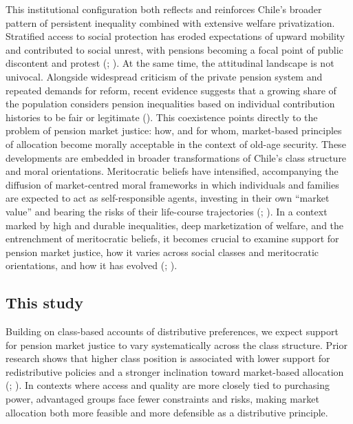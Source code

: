 \documentclass[
  12pt,
]{article}
\begin{document}
This institutional configuration both reflects and reinforces Chile's
broader pattern of persistent inequality combined with extensive welfare
privatization. Stratified access to social protection has eroded
expectations of upward mobility and contributed to social unrest, with
pensions becoming a focal point of public discontent and protest
(;
). At the same time, the
attitudinal landscape is not univocal. Alongside widespread criticism of
the private pension system and repeated demands for reform, recent
evidence suggests that a growing share of the population considers
pension inequalities based on individual contribution histories to be
fair or legitimate (). This coexistence points directly to the problem of pension
market justice: how, and for whom, market-based principles of allocation
become morally acceptable in the context of old-age security. These
developments are embedded in broader transformations of Chile's class
structure and moral orientations. Meritocratic beliefs have intensified,
accompanying the diffusion of market-centred moral frameworks in which
individuals and families are expected to act as self-responsible agents,
investing in their own ``market value'' and bearing the risks of their
life-course trajectories
(;
). In a context marked by
high and durable inequalities, deep marketization of welfare, and the
entrenchment of meritocratic beliefs, it becomes crucial to examine
support for pension market justice, how it varies across social classes
and meritocratic orientations, and how it has evolved
(;
).

\subsection{This study}\label{this-study}

Building on class-based accounts of distributive preferences, we expect
support for pension market justice to vary systematically across the
class structure. Prior research shows that higher class position is
associated with lower support for redistributive policies and a stronger
inclination toward market-based allocation
(;
). In contexts where access
and quality are more closely tied to purchasing power, advantaged groups
face fewer constraints and risks, making market allocation both more
feasible and more defensible as a distributive principle.
\end{document}
